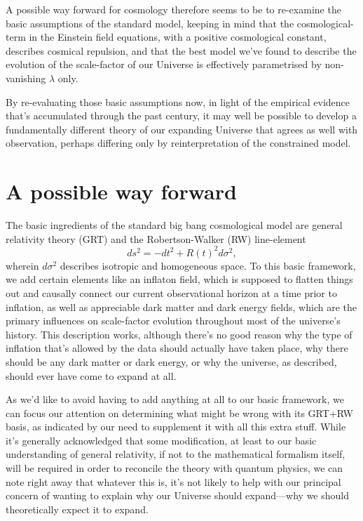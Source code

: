 \documentclass[12 pt]{article}
\begin{document}
A possible way forward for cosmology therefore seems to be to re-examine the basic assumptions of the standard model, keeping in mind that the cosmological-term in the Einstein field equations, with a positive cosmological constant, describes cosmical repulsion, and that the best model we've found to describe the evolution of the scale-factor of our Universe is effectively parametrised by non-vanishing $\lambda$ only. 

By re-evaluating those basic assumptions now, in light of the empirical evidence that's accumulated through the past century, it may well be possible to develop a fundamentally different theory of our expanding Universe that agrees as well with observation, perhaps differing only by reinterpretation of the constrained model.

\section{A possible way forward}
\label{sec:6}
The basic ingredients of the standard big bang cosmological model are general relativity theory (GRT) and the Robertson-Walker (RW) line-element
\begin{equation}
ds^2=-dt^2+R(t)^2d\sigma^2,
\end{equation}
wherein $d\sigma^2$ describes isotropic and homogeneous space. To this basic framework, we add certain elements like an inflaton field, which is supposed to flatten things out and causally connect our current observational horizon at a time prior to inflation, as well as appreciable dark matter and dark energy fields, which are the primary influences on scale-factor evolution throughout most of the universe's history. This description works, although there's no good reason why the type of inflation that's allowed by the data should actually have taken place, why there should be any dark matter or dark energy, or why the universe, as described, should ever have come to expand at all.

As we'd like to avoid having to add anything at all to our basic framework, we can focus our attention on determining what might be wrong with its GRT+RW basis, as indicated by our need to supplement it with all this extra stuff. While it's generally acknowledged that some modification, at least to our basic understanding of general relativity, if not to the mathematical formalism itself, will be required in order to reconcile the theory with quantum physics, we can note right away that whatever this is, it's not likely to help with our principal concern of wanting to explain why our Universe should expand---why we should theoretically expect it to expand. 
\end{document}
